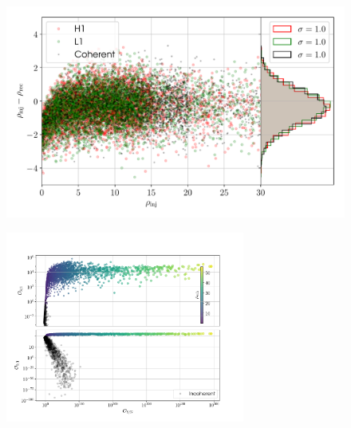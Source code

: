 \begin{figure}[!phtb]
\begin{center}
\includegraphics[width=1\columnwidth]{./figures/codeeval/stats/snrs/snr_plot}
\caption{ \protect}
\end{center}
\end{figure}


\begin{figure}[phtb]
\begin{center}
\includegraphics[width=0.7\textwidth]{./figures/codeeval/stats/odds/odds_plot}
\caption{ \protect}
\end{center}
\end{figure}


